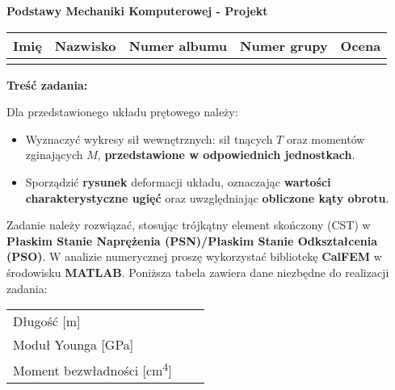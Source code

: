 \documentclass[a4paper,10pt]{article}
\begin{document}
\begin{center}
    {\Large \textbf{Podstawy Mechaniki Komputerowej - Projekt}}
    \end{center}

    \begin{table}[ht]
        \centering
        \begin{tabular}{
            m{}m{}m{}m{}m{}}
        \toprule
        Imię & Nazwisko & Numer albumu & Numer grupy  & Ocena \\ \midrule
             &          &              &              &       \\ \bottomrule
        \end{tabular}
        \label{tab:dane_studenta}
    \end{table}

    \noindent\textbf{Treść zadania:} \vspace{1mm}

    Dla przedstawionego układu prętowego należy:

    \begin{itemize}
        \item Wyznaczyć wykresy sił wewnętrznych: sił tnących \(T\) oraz momentów zginających \(M\), \textbf{przedsta\-wione w odpowiednich jednostkach}.
        \item Sporządzić \textbf{rysunek} deformacji układu, oznaczając \textbf{wartości charakterystyczne ugięć} oraz uwzględniając \textbf{obliczone kąty obrotu}.
    \end{itemize}

    Zadanie należy rozwiązać, stosując trójkątny element skończony (CST) w \textbf{Płaskim Stanie Naprężenia (PSN)/Płaskim Stanie Odkształcenia (PSO)}. W analizie numerycznej proszę wykorzystać bibliotekę \textbf{CalFEM} w środowisku \textbf{MATLAB}. Poniższa tabela zawiera dane niezbędne do realizacji zadania:

    \begin{table}[ht]
    \centering
    \renewcommand{\arraystretch}{1.25}
    \begin{tabular}{lll}
    \toprule
    Długość [\si{m}] &
            \\
    Moduł Younga [\si{GPa}] &
            \\
    Moment bezwładności [\si{\centi\meter^4}] &
            \\
    \bottomrule
    \end{tabular}
    \label{tab:dane_zadania2}
    \end{table}
\end{document}
